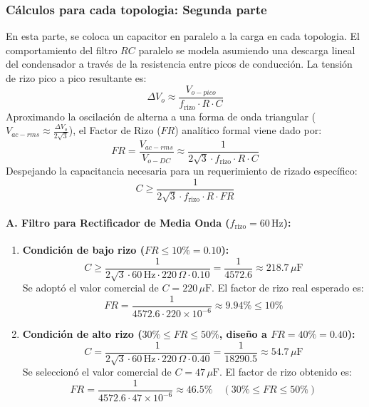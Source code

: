 \subsubsection{Cálculos para cada topologia: Segunda parte}

En esta parte, se coloca un capacitor en paralelo a la carga en cada topologia. El comportamiento del filtro $RC$ paralelo se modela asumiendo una descarga lineal del condensador a través de la resistencia entre picos de conducción. La tensión de rizo pico a pico resultante es:
\begin{equation}
    \Delta V_o \approx \frac{V_{o-pico}}{f_{\mathrm{rizo}} \cdot R \cdot C}
\end{equation}
Aproximando la oscilación de alterna a una forma de onda triangular ($V_{ac-rms} \approx \frac{\Delta V_o}{2\sqrt{3}}$), el Factor de Rizo ($FR$) analítico formal viene dado por:
\begin{equation}
    FR = \frac{V_{ac-rms}}{V_{o-DC}} \approx \frac{1}{2\sqrt{3} \cdot f_{\mathrm{rizo}} \cdot R \cdot C}
\end{equation}
Despejando la capacitancia necesaria para un requerimiento de rizado específico:
\begin{equation}
    C \ge \frac{1}{2\sqrt{3} \cdot f_{\mathrm{rizo}} \cdot R \cdot FR}
    \label{eq:despeje_C}
\end{equation}

\paragraph{A. Filtro para Rectificador de Media Onda ($f_{\mathrm{rizo}} = 60\,\mathrm{Hz}$):}
\begin{enumerate}
    \item \textbf{Condición de bajo rizo ($FR \le 10\% = 0.10$):}
    \begin{equation}
        C \ge \frac{1}{2\sqrt{3} \cdot 60\,\mathrm{Hz} \cdot 220\,\Omega \cdot 0.10} = \frac{1}{4572.6} \approx 218.7\,\mu\mathrm{F}
    \end{equation}
    Se adoptó el valor comercial de \textbf{$C = 220\,\mu\mathrm{F}$}. El factor de rizo real esperado es:
    \begin{equation}
        FR = \frac{1}{4572.6 \cdot 220 \times 10^{-6}} \approx \mathbf{9.94\%} \le 10\%
    \end{equation}
    \item \textbf{Condición de alto rizo ($30\% \le FR \le 50\%$, diseño a $FR = 40\% = 0.40$):}
    \begin{equation}
        C = \frac{1}{2\sqrt{3} \cdot 60\,\mathrm{Hz} \cdot 220\,\Omega \cdot 0.40} = \frac{1}{18290.5} \approx 54.7\,\mu\mathrm{F}
    \end{equation}
    Se seleccionó el valor comercial de \textbf{$C = 47\,\mu\mathrm{F}$}. El factor de rizo obtenido es:
    \begin{equation}
        FR = \frac{1}{4572.6 \cdot 47 \times 10^{-6}} \approx \mathbf{46.5\%} \quad (30\% \le FR \le 50\%)
    \end{equation}
\end{enumerate}

